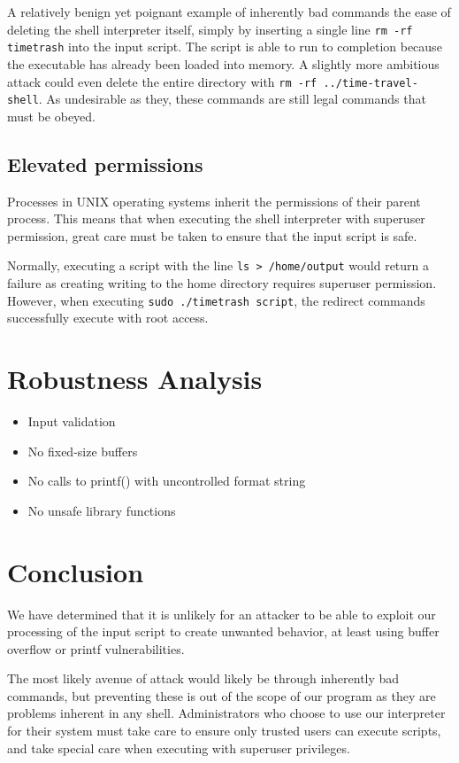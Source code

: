 \documentclass[12pt]{article}
\begin{document}
A relatively benign yet poignant example of inherently bad commands the ease of deleting the shell interpreter itself, simply by inserting a single line \texttt{rm -rf timetrash} into the input script. The script is able to run to completion because the executable has already been loaded into memory. A slightly more ambitious attack could even delete the entire directory with \texttt{rm -rf ../time-travel-shell}. As undesirable as they, these commands are still legal commands that must be obeyed.

\subsection{Elevated permissions}
Processes in UNIX operating systems inherit the permissions of their parent process. This means that when executing the shell interpreter with superuser permission, great care must be taken to ensure that the input script is safe.

Normally, executing a script with the line \texttt{ls > /home/output} would return a failure as creating writing to the home directory requires superuser permission. However, when executing \texttt{sudo ./timetrash script}, the redirect commands successfully execute with root access.

\section{Robustness Analysis}
\begin{itemize}
	\item Input validation
	\item No fixed-size buffers
	\item No calls to printf() with uncontrolled format string
	\item No unsafe library functions
\end{itemize}

\section{Conclusion}
We have determined that it is unlikely for an attacker to be able to exploit our processing of the input script to create unwanted behavior, at least using buffer overflow or printf vulnerabilities.

The most likely avenue of attack would likely be through inherently bad commands, but preventing these is out of the scope of our program as they are problems inherent in any shell. Administrators who choose to use our interpreter for their system must take care to ensure only trusted users can execute scripts, and take special care when executing with superuser privileges.
\end{document}
